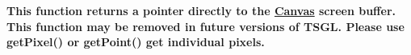 
\begin{DoxyRefList}
\item[\label{deprecated__deprecated000001}%
\Hypertarget{deprecated__deprecated000001}%
Member \hyperlink{classtsgl_1_1_canvas_a71f072dd82ca3b5cecfd65cde6d8a226}{tsgl\+:\+:Canvas\+:\+:get\+Screen\+Buffer} ()]{\bfseries This function returns a pointer directly to the \hyperlink{classtsgl_1_1_canvas}{Canvas}\textquotesingle{} screen buffer. This function may be removed in future versions of T\+S\+GL. Please use get\+Pixel() or get\+Point() get individual pixels. }
\end{DoxyRefList}